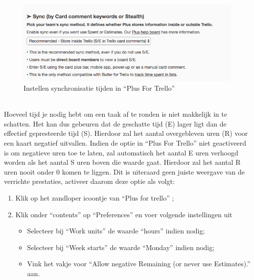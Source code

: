 \begin{figure}[h]
	\centering
	\includegraphics[width=\textwidth]{./afbeeldingen/synctrello.png}
	\caption{Instellen synchronisatie tijden in ``Plus For Trello''}
	\label{fig:synctrello}
\end{figure} 
\pagebreak
{}
\noindent
\\Hoeveel tijd je nodig hebt om een taak af te ronden is niet makkelijk in te schatten.  Het kan dus gebeuren dat de geschatte tijd (E) lager ligt dan de effectief gepresteerde tijd (S). Hierdoor zal het aantal overgebleven uren (R) voor een kaart negatief uitvallen. Indien de optie in ``Plus For Trello'' niet geactiveerd is om negatieve uren toe te laten, zal automatisch het aantal E uren verhoogd worden als het aantal S uren boven die waarde  gaat. Hierdoor zal het aantal R uren nooit onder 0 komen te liggen. Dit is uiteraard geen juiste weergave van de verrichte prestaties, activeer daarom deze optie als volgt:
\begin{enumerate}[nolistsep]
	\item Klik op het zandloper icoontje van ``Plus for trello'' ;
	\item Klik onder ``contents'' op ``Preferences'' en voer volgende instellingen uit 
	\begin{itemize}
		\item Selecteer bij ``Work units'' de waarde ``hours'' indien nodig;
		\item Selecteer bij ``Week starts'' de waarde ``Monday'' indien nodig;
		\item Vink het vakje voor ``Allow negative Remaining (or never use Estimates).'' aan.
	\end{itemize}
\end{enumerate}

